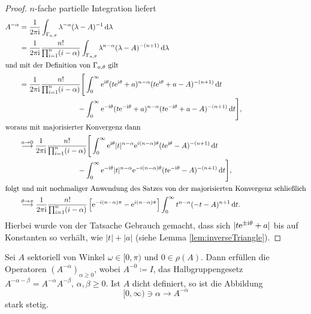 \begin{proof}
  $n$-fache partielle Integration liefert
  \begin{align*}
    A^{-\alpha}
    &= \frac{1}{2\pi \mathrm{i}} \int_{\Gamma_{a, \theta}} \lambda^{-\alpha} (\lambda - A)^{-1} \, {\operatorname{d}\!{\lambda}} \\
    &= \frac{1}{2\pi \mathrm{i}} \frac{n!}{\prod_{i = 1}^n (i - \alpha)} \int_{\Gamma_{a , \theta}} \lambda^{n - \alpha} (\lambda - A)^{-(n+1)} \, {\operatorname{d}\!{\lambda}} \\
    \intertext{und mit der Definition von $\Gamma_{a,\theta}$ gilt}
    &= \frac{1}{2\pi \mathrm{i}} \frac{n!}{\prod_{i = 1}^n ( i - \alpha )} \Bigg[ \int_0^\infty \mathrm{e}^{\mathrm{i}\theta} (t \mathrm{e}^{\mathrm{i}\theta} + a )^{n - \alpha} (t \mathrm{e}^{\mathrm{i}\theta} + a - A)^{-(n+1)} \, {\operatorname{d}\!{t}}  \\
    &\quad\quad\quad\quad\quad\quad\quad\quad- \int_0^\infty \mathrm{e}^{-\mathrm{i}\theta} (t \mathrm{e}^{-\mathrm{i}\theta} + a)^{n - \alpha} (t \mathrm{e}^{-\mathrm{i}\theta} + a - A)^{-(n + 1)} \, {\operatorname{d}\!{t}}\Bigg], \\
    \intertext{woraus mit majorisierter Konvergenz dann}
    &\overset{a \to 0}{\longrightarrow} \frac{1}{2\pi \mathrm{i}} \frac{n!}{\prod_{i = 1}^n ( i - \alpha )} 
    \Bigg[ \int_0^\infty \mathrm{e}^{\mathrm{i}\theta} |t|^{n - \alpha} \mathrm{e}^{i(n - \alpha)\theta} (t \mathrm{e}^{\mathrm{i}\theta} - A)^{-(n+1)} \, {\operatorname{d}\!{t}}  \\
    &\quad\quad\quad\quad\quad\quad\quad\quad - \int_0^\infty \mathrm{e}^{-\mathrm{i}\theta} |t|^{n - \alpha} \mathrm{e}^{-i(n - \alpha)\theta} (t \mathrm{e}^{-\mathrm{i}\theta} - A)^{-(n + 1)} \, {\operatorname{d}\!{t}}\Bigg],\\
    \intertext{folgt und mit nochmaliger Anwendung des Satzes von der majorisierten Konvergenz schließlich}
    &\overset{\theta \to \pi}{\longrightarrow} \frac{1}{2\pi \mathrm{i}} \frac{n!}{\prod_{i = 1}^n (i - \alpha)}
    \left[ \mathrm{e}^{-i (n - \alpha) \pi} - \mathrm{e}^{i (n - \alpha)\pi} \right] \int_0^\infty t^{n -\alpha} (-t - A)^{n + 1} \, {\operatorname{d}\!{t}}.
  \end{align*}
  Hierbei wurde von der Tatsache Gebrauch gemacht, dass sich $|t \mathrm{e}^{\pm \mathrm{i} \theta} + a|$ bis auf Konstanten so verhält, wie $|t| + |a|$ (siehe Lemma \ref{lem:inverseTriangle}).
\end{proof}

\begin{thm}
  \label{thm:fracPowSemigroup}
  Sei $A$ sektoriell von Winkel $\omega \in [0,\pi)$ und $0 \in \rho(A)$.
  Dann erfüllen die Operatoren $(A^{-\alpha})_{\alpha \geq 0}$, wobei $A^{-0} \coloneqq I$, das Halbgruppengesetz $A^{-\alpha - \beta} = A^{-\alpha} A^{-\beta}$, $\alpha,\beta \geq 0$.
  Ist $A$ dicht definiert, so ist die Abbildung
  $$
  [0,\infty) \ni \alpha \to A^{-\alpha}
  $$
  stark stetig.
\end{thm}

